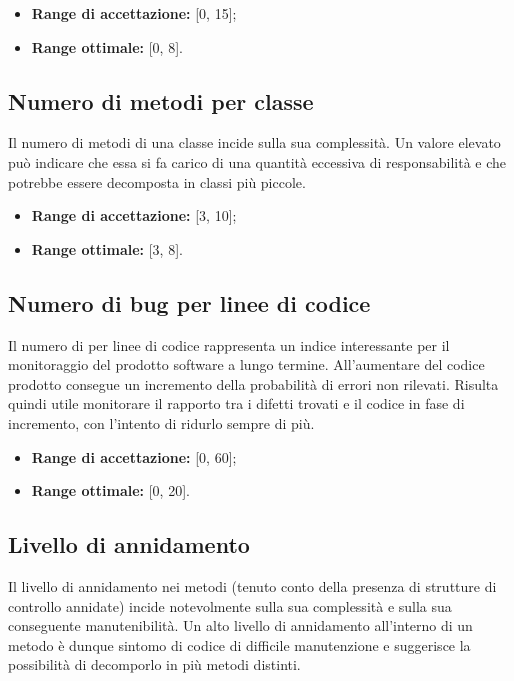 \documentclass[openany,12pt,a4paper]{report}
\begin{document}
\begin{itemize}
    \item \textbf{Range di accettazione:} [0, 15];
    
    \item \textbf{Range ottimale:} [0, 8].
\end{itemize}

\subsection{Numero di metodi per classe}

Il numero di metodi di una classe incide sulla sua complessità. Un valore elevato può indicare che essa si fa carico di una quantità eccessiva di responsabilità e che potrebbe essere decomposta in classi più piccole.

\begin{itemize}
    \item \textbf{Range di accettazione:} [3, 10];
    
    \item \textbf{Range ottimale:} [3, 8].
\end{itemize}

\subsection{Numero di bug per linee di codice}

Il numero di  per linee di codice rappresenta un indice interessante per il monitoraggio del prodotto software a lungo termine. All’aumentare del codice prodotto consegue un incremento della probabilità
di errori non rilevati. Risulta quindi utile monitorare il rapporto tra i difetti trovati e il codice in fase di incremento, con l'intento di ridurlo sempre di più.

\begin{itemize}
    \item \textbf{Range di accettazione:} [0, 60];
    
    \item \textbf{Range ottimale:} [0, 20].
\end{itemize}

\subsection{Livello di annidamento}

Il livello di annidamento nei metodi (tenuto conto della presenza di strutture di controllo annidate) incide notevolmente sulla sua complessità e sulla sua conseguente manutenibilità.
Un alto livello di annidamento all'interno di un metodo è dunque sintomo di codice di difficile manutenzione e suggerisce la possibilità di decomporlo in più metodi distinti.
\end{document}
